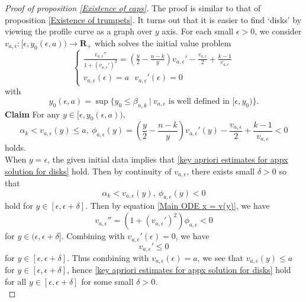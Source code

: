 \documentclass[pdflatex,sn-mathphys-num]{sn-jnl}
\begin{document}
\begin{proof}[Proof of proposition \ref{Existence of caps}]
    The proof is similar to that of proposition \ref{Existence of trumpets}. It turns out that it is easier to find `disks' by viewing the profile curve as a graph over $y$ axis. For each small $\epsilon > 0$, we consider $v_{a, \epsilon}: [\epsilon, y_0(\epsilon, a)) \to \mathbf{R}_+$ which solves the initial value problem
    \begin{equation}
        \begin{cases}
            \frac{v_{a, \epsilon}''}{1 + (v_{a, \epsilon}')^2} = (\frac{y}{2} - \frac{n - k}{y})v_{a, \epsilon}' - \frac{v_{a, \epsilon}}{2} + \frac{k-1}{v_{a, \epsilon}} \\
            v_{a, \epsilon}(\epsilon) = a \ \ \ v_{a, \epsilon}'(\epsilon) = 0
        \end{cases}
    \end{equation}
with
\begin{equation}\label{definition of y0(epsilon, a)}
    y_0(\epsilon,a) = \sup \{y_0 \leq \beta_{n,k}\ | \ v_{a, \epsilon} \text{ is well defined in }[\epsilon, y_0) \}.
\end{equation}
 \textbf{Claim} For any $y \in [\epsilon, y_0(\epsilon, a))$,
 \begin{equation}\label{key apriori estimates for appx solution for disks}
     \alpha_k < v_{a, \epsilon}(y) \leq a, \ \phi_{a, \epsilon}(y) = (\frac{y}{2} - \frac{n-k}{y})v_{a, \epsilon}'(y) - \frac{v_{a, \epsilon}}{2} + \frac{k-1}{v_{a, \epsilon}} < 0
 \end{equation}
holds. \\

When $y = \epsilon$, the given initial data implies that \eqref{key apriori estimates for appx solution for disks} hold. Then by continuity of $v_{a, \epsilon}$, there exists small $\delta > 0$ so that 
$$\alpha_k < v_{a, \epsilon}(y), \ \phi_{a, \epsilon}(y) < 0$$
hold for $y \in [\epsilon, \epsilon + \delta]$. 
Then by equation \eqref{Main ODE x = v(y)}, we have \begin{equation}
    v_{a, \epsilon}''  = (1 + (v_{a, \epsilon}')^2)\phi_{a, \epsilon} < 0
\end{equation} for $y \in (\epsilon, \epsilon + \delta]$. Combining with $v_{a, \epsilon}'(\epsilon) = 0$, we have 
$$v_{a, \epsilon}' \leq 0$$
for $y \in [\epsilon, \epsilon + \delta]$. Thus combining with $v_{a, \epsilon}(\epsilon) = a$, we see that $v_{a, \epsilon}(y) \leq a$ for $y \in [\epsilon, \epsilon + \delta]$, hence \eqref{key apriori estimates for appx solution for disks} hold for all $y \in [\epsilon, \epsilon + \delta]$ for some small $\delta > 0$.\\


\end{proof}
\end{document}
